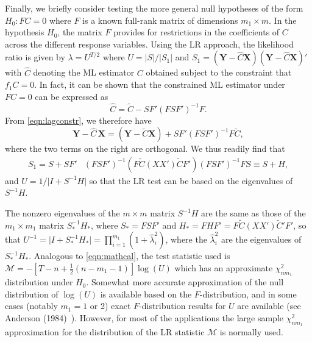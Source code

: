 Finally, we briefly consider testing the more general null hypotheses of the form $H_0: FC=0$ where $F$ is a known full-rank matrix of dimensions $m_1 \times m$. In the hypothesis $H_0$, the matrix $F$ provides for restrictions in the coefficients of $C$ across the different response variables. Using the LR approach, the likelihood ratio is given by $\lambda= U^{T/2}$ where $U= |S|/|S_1|$ and $S_1= (\mathbf{Y} - \hat{C}\mathbf{X})(\mathbf{Y}  - \hat{C}\mathbf{X})'$ with $\hat{C}$ denoting the ML estimator $C$ obtained subject to the constraint that $f_1C=0$. In fact, it can be shown that the constrained ML estimator under $FC= 0$ can be expressed as
	\begin{equation} \label{eqn:lagconstr}
	\hat{C}= \tilde{C} - SF'(FSF')^{-1} F.
	\end{equation}
From \eqref{eqn:lagconstr}, we therefore have
	\begin{equation} \label{eqn:boldys}
	\mathbf{Y} - \hat{C} \,\mathbf{X}= ( \mathbf{Y} - \tilde{C} \mathbf{X}  ) + SF'(FSF')^{-1} F \tilde{C},
	\end{equation}
where the two terms on the right are orthogonal. We thus readily find that
	\begin{equation} \label{eqn:lastdouble5}
	\begin{split}
	S_1= S + SF'&(FSF')^{-1}( F\tilde{C} (XX') \tilde{C} F' )(FSF')^{-1} FS \equiv S + H,
	\end{split}
	\end{equation}
and $U= 1/\lvert I + S^{-1}H \rvert$ so that the LR test can be based on the eigenvalues of $S^{-1}H$.


The nonzero eigenvalues of the $m \times m$ matrix $S^{-1} H$ are the same as those of the $m_1 \times m_1$ matrix $S_*^{-1} H_*$, where $S_*= FSF'$ and $H_* = FHF' = F \tilde{C} (XX') \tilde{C}' F'$, so that $U^{-1} = \lvert I + S_*^{-1} H_* \rvert= \prod_{i=1}^{m_1} (1 + \hat{\lambda}_i^2 )$, where the $\hat{\lambda}_i^2$ are the eigenvalues of $S_*^{-1} H_*$. Analogous to \eqref{eqn:mathcal}, the test statistic used is $\mathcal{M}= -[T - n + \frac{1}{2}(n - m_1 - 1)]\log(U)$ which has an approximate $\chi_{nm_1}^2$ distribution under $H_0$. Somewhat more accurate approximation of the null distribution of $\log(U)$ is available based on the $F$-distribution, and in some cases (notably $m_1= 1$ or 2) exact $F$-distribution results for $U$ are available (see Anderson (1984)~\cite[Chap. 8]{andersontw2}). However, for most of the applications the large sample $\chi_{nm_1}^2$ approximation for the distribution of the LR statistic $\mathcal{M}$ is normally used. \\



